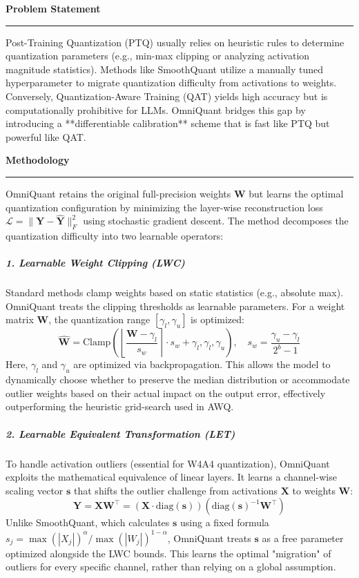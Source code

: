 \documentclass[11pt,a4paper]{article}
\newcommand{\problemp}[1]{%
  \par\medskip
  {\noindent\bfseries\normalsize\color{signcol}#1\par}%
  \vspace{0.4ex}%
  {\noindent\color{softgray}\rule{\linewidth}{0.6pt}\par}%
  \vspace{0.8ex}%
}
\theoremstyle{definition}
\begin{document}
\problemp{Problem Statement}
Post-Training Quantization (PTQ) usually relies on heuristic rules to determine quantization parameters (e.g., min-max clipping or analyzing activation magnitude statistics). Methods like SmoothQuant utilize a manually tuned hyperparameter to migrate quantization difficulty from activations to weights. Conversely, Quantization-Aware Training (QAT) yields high accuracy but is computationally prohibitive for LLMs. OmniQuant bridges this gap by introducing a **differentiable calibration** scheme that is fast like PTQ but powerful like QAT.

\vspace{1cm}
\problemp{Methodology}
OmniQuant retains the original full-precision weights $\bm{W}$ but learns the optimal quantization configuration by minimizing the layer-wise reconstruction loss $\mathcal{L} = \|\bm{Y} - \hat{\bm{Y}}\|_F^2$ using stochastic gradient descent. The method decomposes the quantization difficulty into two learnable operators:

\subparagraph{1. Learnable Weight Clipping (LWC)}
Standard methods clamp weights based on static statistics (e.g., absolute max). OmniQuant treats the clipping thresholds as learnable parameters. For a weight matrix $\bm{W}$, the quantization range $[\gamma_l, \gamma_u]$ is optimized:
\begin{equation}
    \hat{\bm{W}} = \text{Clamp}\left(\left\lfloor \frac{\bm{W} - \gamma_l}{s_w} \right\rceil \cdot s_w + \gamma_l, \gamma_l, \gamma_u\right), \quad s_w = \frac{\gamma_u - \gamma_l}{2^b - 1}
\end{equation}
Here, $\gamma_l$ and $\gamma_u$ are optimized via backpropagation. This allows the model to dynamically choose whether to preserve the median distribution or accommodate outlier weights based on their actual impact on the output error, effectively outperforming the heuristic grid-search used in AWQ.

\subparagraph{2. Learnable Equivalent Transformation (LET)}
To handle activation outliers (essential for W4A4 quantization), OmniQuant exploits the mathematical equivalence of linear layers. It learns a channel-wise scaling vector $\bm{s}$ that shifts the outlier challenge from activations $\bm{X}$ to weights $\bm{W}$:
\begin{equation}
    \bm{Y} = \bm{X}\bm{W}^\top = (\bm{X} \cdot \text{diag}(\bm{s})) (\text{diag}(\bm{s})^{-1} \bm{W}^\top)
\end{equation}
Unlike SmoothQuant, which calculates $\bm{s}$ using a fixed formula $s_j = \max(|X_j|)^\alpha / \max(|W_j|)^{1-\alpha}$, OmniQuant treats $\bm{s}$ as a free parameter optimized alongside the LWC bounds. This learns the optimal "migration" of outliers for every specific channel, rather than relying on a global assumption.
\end{document}
